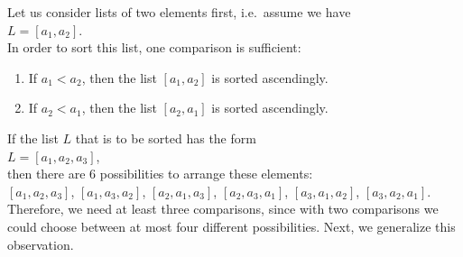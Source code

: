 Let us consider lists of two elements first, i.e.~assume we have
\\[0.2cm]
\hspace*{1.3cm}
$L = [a_1, a_2]$.  
\\[0.2cm]
In order to sort this list, one comparison is sufficient:
\begin{enumerate}
 \item If $a_1 < a_2$, then the list $[a_1, a_2]$ is sorted ascendingly.
 \item If $a_2 < a_1$, then the list $[a_2, a_1]$ is sorted ascendingly.
\end{enumerate}
If the list $L$ that is to be sorted has the form
\\[0.2cm]
\hspace*{1.3cm}
$L = [a_1,a_2,a_3]$,
\\[0.2cm]
then there are 6 possibilities to arrange these elements:
\\[0.2cm]
\hspace*{0.3cm}
$[a_1,a_2,a_3]$, \quad
$[a_1,a_3,a_2]$, \quad
$[a_2,a_1,a_3]$, \quad
$[a_2,a_3,a_1]$, \quad
$[a_3,a_1,a_2]$, \quad
$[a_3,a_2,a_1]$. 
\\[0.2cm]
Therefore, we need at least three comparisons, since with two comparisons we could choose between at most 
four different possibilities.  Next, we generalize this observation.


